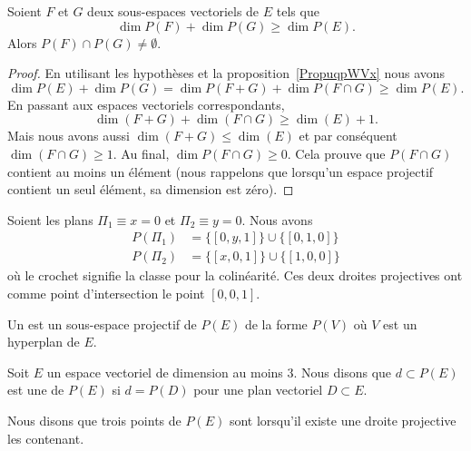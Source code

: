 \begin{theorem}[incidence]
	Soient \( F\) et \( G\) deux sous-espaces vectoriels de \( E\) tels que
	\begin{equation}
		\dim P(F)+\dim P(G)\geq \dim P(E).
	\end{equation}
	Alors \( P(F)\cap P(G)\neq \emptyset\).
\end{theorem}

\begin{proof}
	En utilisant les hypothèses et la proposition~\ref{PropuqpWVx} nous avons
	\begin{equation}
		\dim P(E)+\dim P(G)=\dim P(F+G)+\dim P(F\cap G)\geq \dim P(E).
	\end{equation}
	En passant aux espaces vectoriels correspondants,
	\begin{equation}
		\dim(F+G)+\dim(F\cap G)\geq \dim(E)+1.
	\end{equation}
	Mais nous avons aussi \( \dim(F+G)\leq \dim(E)\) et par conséquent \( \dim(F\cap G)\geq 1\). Au final, \( \dim P(F\cap G)\geq 0\). Cela prouve que \( P(F\cap G)\) contient au moins un élément (nous rappelons que lorsqu'un espace projectif contient un seul élément, sa dimension est zéro).
\end{proof}

\begin{example}
	Soient les plans \( \Pi_1\equiv x=0\) et \( \Pi_2\equiv y=0\). Nous avons
	\begin{subequations}
		\begin{align}
			P(\Pi_1) & =\{ [0,y,1] \}\cup\{ [0,1,0] \} \\
			P(\Pi_2) & =\{ [x,0,1] \}\cup\{ [1,0,0] \}
		\end{align}
	\end{subequations}
	où le crochet signifie la classe pour la colinéarité. Ces deux droites projectives ont comme point d'intersection le point \( [0,0,1]\).
\end{example}

\begin{definition}
	Un  est un sous-espace projectif de \( P(E)\) de la forme \( P(V)\) où \( V\) est un hyperplan de \( E\).
\end{definition}

\begin{definition}      \label{DEFooBBMBooSVgTnn}
	Soit \( E\) un espace vectoriel de dimension au moins \( 3\). Nous disons que \( d\subset P(E)\) est une  de \( P(E)\) si \( d=P(D)\) pour une plan vectoriel \( D\subset E\).

	Nous disons que trois points de \( P(E)\) sont  lorsqu'il existe une droite projective les contenant.
\end{definition}

